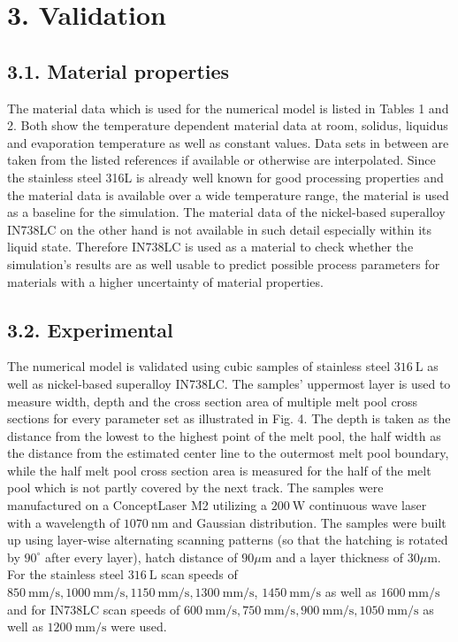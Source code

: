 \documentclass[10pt]{article}
\begin{document}
\section*{3. Validation}
\subsection*{3.1. Material properties}
The material data which is used for the numerical model is listed in Tables 1 and 2. Both show the temperature dependent material data at room, solidus, liquidus and evaporation temperature as well as constant values. Data sets in between are taken from the listed references if available or otherwise are interpolated. Since the stainless steel 316L is already well known for good processing properties and the material data is available over a wide temperature range, the material is used as a baseline for the simulation. The material data of the nickel-based superalloy IN738LC on the other hand is not available in such detail especially within its liquid state. Therefore IN738LC is used as a material to check whether the simulation's results are as well usable to predict possible process parameters for materials with a higher uncertainty of material properties.

\subsection*{3.2. Experimental}
The numerical model is validated using cubic samples of stainless steel $316 \mathrm{~L}$ as well as nickel-based superalloy IN738LC. The samples' uppermost layer is used to measure width, depth and the cross section area of multiple melt pool cross sections for every parameter set as illustrated in Fig. 4. The depth is taken as the distance from the lowest to the highest point of the melt pool, the half width as the distance from the estimated center line to the outermost melt pool boundary, while the half melt pool cross section area is measured for the half of the melt pool which is not partly covered by the next track. The samples were manufactured on a ConceptLaser M2 utilizing a $200 \mathrm{~W}$ continuous wave laser with a wavelength of $1070 \mathrm{~nm}$ and Gaussian distribution. The samples were built up using layer-wise alternating scanning patterns (so that the hatching is rotated by $90^{\circ}$ after every layer), hatch distance of $90 \mu \mathrm{m}$ and a layer thickness of $30 \mu \mathrm{m}$. For the stainless steel $316 \mathrm{~L}$ scan speeds of $850 \mathrm{~mm} / \mathrm{s}, 1000 \mathrm{~mm} / \mathrm{s}, 1150 \mathrm{~mm} / \mathrm{s}, 1300 \mathrm{~mm} / \mathrm{s}$, $1450 \mathrm{~mm} / \mathrm{s}$ as well as $1600 \mathrm{~mm} / \mathrm{s}$ and for IN738LC scan speeds of $600 \mathrm{~mm} / \mathrm{s}, 750 \mathrm{~mm} / \mathrm{s}, 900 \mathrm{~mm} / \mathrm{s}, 1050 \mathrm{~mm} / \mathrm{s}$ as well as $1200 \mathrm{~mm} / \mathrm{s}$ were used.
\end{document}
